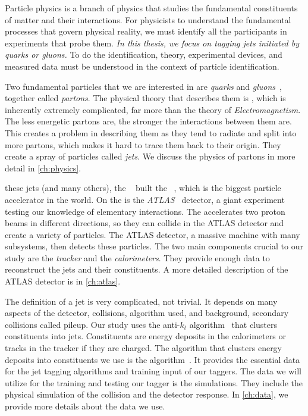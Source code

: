 

Particle physics is a branch of physics that studies the fundamental constituents of matter and their interactions.
For physicists to understand the fundamental processes that govern physical reality, we must identify all the participants in experiments that probe them. 
\emph{In this thesis, we focus on tagging jets initiated by quarks or gluons.}
To do the identification, theory, experimental devices, and measured data must be understood in the context of particle identification.

Two fundamental particles that we are interested in are \emph{quarks} and \emph{gluons}~\cite{quarks}, together called \emph{partons}.
The physical theory that describes them is \QCD, which is inherently extremely complicated, far more than the theory of \emph{Electromagnetism}.
The less energetic partons are, the stronger the interactions between them are. 
This creates a problem in describing them as they tend to radiate and split into more partons, which makes it hard to trace them back to their origin.
They create a spray of particles called \emph{jets}.
We discuss the physics of partons in more detail in \cref{ch:physics}.

 these jets (and many others), the \CERN~\cite{cern} built the \LHC~\cite{LHC}, which is the biggest particle accelerator in the world.
On the \LHC is the \emph{ATLAS}~\cite{ATLAS} detector, a giant experiment testing our knowledge of elementary interactions. 
The \LHC accelerates two proton beams in different directions, so they can collide in the ATLAS detector and create a variety of particles.
The ATLAS detector, a massive machine with many subsystems, then detects these particles.
The two main components crucial to our study are the \emph{tracker} and the \emph{calorimeters}.
They provide enough data to reconstruct the jets and their constituents.
A more detailed description of the ATLAS detector is in \cref{ch:atlas}.

The definition of a jet is very complicated, not trivial.
It depends on many aspects of the detector, collisions, algorithm used, and background, secondary collisions called pileup.
Our study uses the anti-$k_t$ algorithm~\cite{antikt} that clusters constituents into jets.
Constituents are energy deposits in the calorimeters or tracks in the tracker if they are charged.
The algorithm that clusters energy deposits into constituents we use is the \PFa algorithm~\cite{PFO}.
It provides the essential data for the jet tagging algorithms and training input of our taggers.
The data we will utilize for the training and testing our tagger is the \MC simulations.
They include the physical simulation of the collision and the detector response.
In \cref{ch:data}, we provide more details about the data we use.

